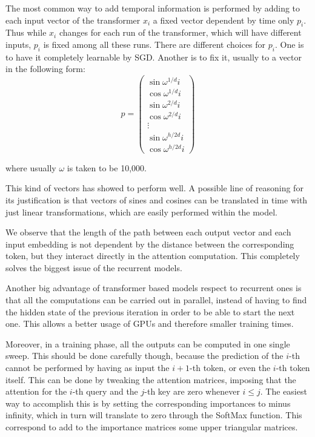 \documentclass[]{marticle}
\begin{document}
The most common way to add temporal information is performed by adding to each input vector of the
transformer $x_i$ a fixed vector dependent by time only $p_i$. Thus while $x_i$ changes for each run
of the transformer, which will have different inputs, $p_i$ is fixed among all these runs. There are
different choices for $p_i$. One is to have it completely learnable by SGD. Another is to fix it,
usually to a vector in the following form:
$$ p = \begin{pmatrix}
\sin\omega^{1/d} i \\
\cos\omega^{1/d} i \\
\sin\omega^{2/d} i \\
\cos\omega^{2/d} i \\
\vdots \\
\sin\omega^{h/2d} i \\
\cos\omega^{h/2d} i
\end{pmatrix}
$$

where usually $\omega$ is taken to be 10,000.

This kind of vectors has showed to perform well. A possible line of reasoning for its justification
is that vectors of sines and cosines can be translated in time with just linear transformations,
which are easily performed within the model.

We observe that the length of the path between each output vector and each input embedding is not
dependent by the distance between the corresponding token, but they interact directly in the
attention computation. This completely solves the biggest issue of the recurrent models.

Another big advantage of transformer based models respect to recurrent ones is that all the
computations can be carried out in parallel, instead of having to find the hidden state of the
previous iteration in order to be able to start the next one. This allows a better usage of GPUs and
therefore smaller training times.

Moreover, in a training phase, all the outputs can be computed in one single sweep. This should be
done carefully though, because the prediction of the $i$-th cannot be performed by having as input
the $i+1$-th token, or even the $i$-th token itself. This can be done by tweaking the attention
matrices, imposing that the attention for the $i$-th query and the $j$-th key are zero whenever $i
\leq j$. The easiest way to accomplish this is by setting the corresponding importances to minus
infinity, which in turn will translate to zero through the SoftMax function. This correspond to add
to the importance matrices some upper triangular matrices.
\end{document}
